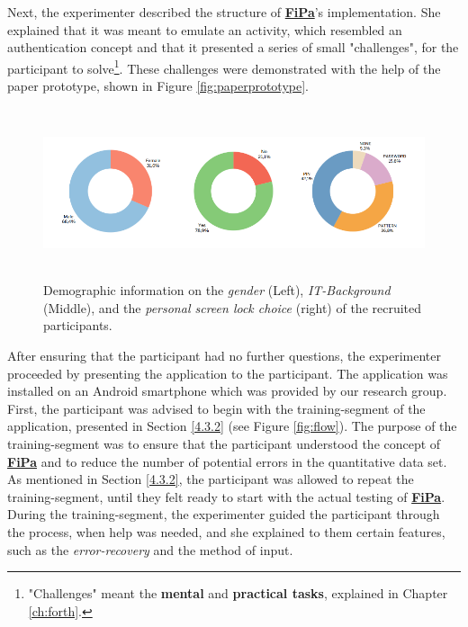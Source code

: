 Next, the experimenter described the structure of \underline{\textbf{FiPa}}'s implementation. She explained that it was meant to emulate an activity, which resembled an authentication concept and that it presented a series of small "challenges", for the participant to solve\footnote{"Challenges" meant the \textbf{mental} and \textbf{practical tasks}, explained in Chapter \ref{ch:forth}.}. These challenges were demonstrated with the help of the paper prototype, shown in Figure \ref{fig:paperprototype}.\\

\begin{figure}[t!]
\centering
\includegraphics[width=15cm, height=5cm]{Chapters/graphics/Demos.PNG}
\caption{Demographic information on the \textit{gender} (Left), \textit{IT-Background} (Middle), and the \textit{personal screen lock choice} (right) of the recruited participants.}
\label{fig:demo}
\end{figure}

After ensuring that the participant had no further questions, the experimenter proceeded by presenting the application to the participant. The application was installed on an Android smartphone which was provided by our research group.\\
First, the participant was advised to begin with the training-segment of the application, presented in Section \ref{4.3.2} (see Figure \ref{fig:flow}). The purpose of the training-segment was to ensure that the participant understood the concept of \underline{\textbf{FiPa}} and to reduce the number of potential errors in the quantitative data set. As mentioned in Section \ref{4.3.2}, the participant was allowed to repeat the training-segment, until they felt ready to start with the actual testing of \underline{\textbf{FiPa}}. During the training-segment, the experimenter guided the participant through the process, when help was needed, and she explained to them certain features, such as the \textit{error-recovery} and the method of input. \\

